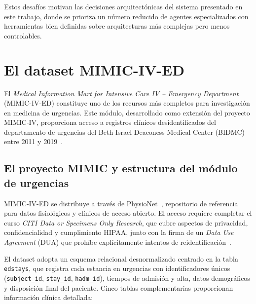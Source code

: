 Estos desafíos motivan las decisiones arquitectónicas del sistema presentado en este trabajo, donde se prioriza un número reducido de agentes especializados con herramientas bien definidas sobre arquitecturas más complejas pero menos controlables.

\section{El dataset \acs{MIMIC}-IV-ED}
\label{sec:mimic-iv-ed}

El \textit{Medical Information Mart for Intensive Care IV -- Emergency Department} (\acs{MIMIC}-IV-\acs{ED}) constituye uno de los recursos más completos para investigación en medicina de urgencias. Este módulo, desarrollado como extensión del proyecto \ac{MIMIC}-IV, proporciona acceso a registros clínicos desidentificados del departamento de urgencias del Beth Israel Deaconess Medical Center (BIDMC) entre 2011 y 2019~\parencite{johnson2023mimiciv}.

\subsection{El proyecto \acs{MIMIC} y estructura del módulo de urgencias}
\label{subsec:mimic-estructura}

\acs{MIMIC}-IV-\acs{ED} se distribuye a través de PhysioNet~\parencite{goldberger2000physionet}, repositorio de referencia para datos fisiológicos y clínicos de acceso abierto. El acceso requiere completar el curso \textit{CITI Data or Specimens Only Research}, que cubre aspectos de privacidad, confidencialidad y cumplimiento \ac{HIPAA}, junto con la firma de un \textit{Data Use Agreement} (DUA) que prohíbe explícitamente intentos de reidentificación~\parencite{johnson2023mimiciv}.

El dataset adopta un esquema relacional desnormalizado centrado en la tabla \texttt{edstays}, que registra cada estancia en urgencias con identificadores únicos (\texttt{subject\_id}, \texttt{stay\_id}, \texttt{hadm\_id}), tiempos de admisión y alta, datos demográficos y disposición final del paciente. Cinco tablas complementarias proporcionan información clínica detallada:

